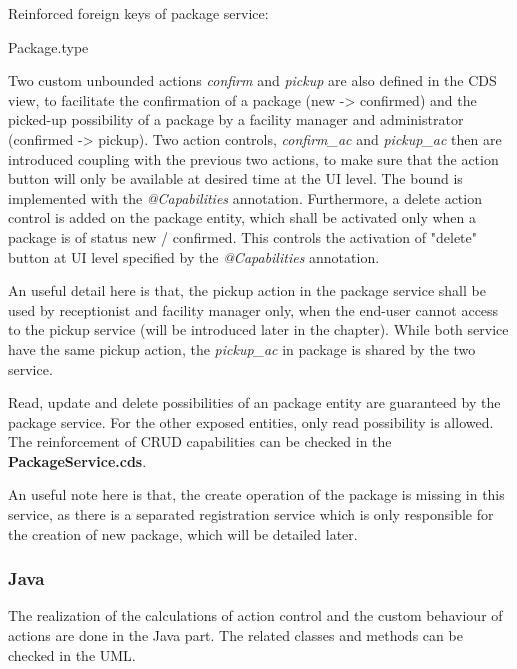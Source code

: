 \bigskip
Reinforced foreign keys of package service:
\begin{compactenum}
	\item Package.type
\end{compactenum}

\bigskip
Two custom unbounded actions \textit{confirm} and \textit{pickup} are also defined in the CDS view, to facilitate the confirmation of a package (new -> confirmed) and the picked-up possibility of a package by a facility manager and administrator (confirmed -> pickup). Two action controls, \textit{confirm\_ac} and \textit{pickup\_ac} then are introduced coupling with the previous two actions, to make sure that the action button will only be available at desired time at the UI level. The bound is implemented with the \textit{@Capabilities} annotation. Furthermore, a delete action control is added on the package entity, which shall be activated only when a package is of status new / confirmed. This controls the activation of "delete" button at UI level specified by the \textit{@Capabilities} annotation. 

\bigskip
An useful detail here is that, the pickup action in the package service shall be used by receptionist and facility manager only, when the end-user cannot access to the pickup service (will be introduced later in the chapter). While both service have the same pickup action, the \textit{pickup\_ac} in package is shared by the two service.

\bigskip
Read, update and delete possibilities of an package entity are guaranteed by the package service. For the other exposed entities, only read possibility is allowed. The reinforcement of CRUD capabilities can be checked in the \textbf{PackageService.cds}. 

\bigskip
An useful note here is that, the create operation of the package is missing in this service, as there is a separated registration service which is only responsible for the creation of new package, which will be detailed later.

\subsubsection{Java}

The realization of the calculations of action control and the custom behaviour of actions are done in the Java part. The related classes and methods can be checked in the UML. 

